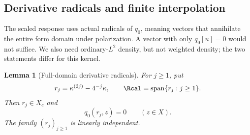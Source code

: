 \documentclass[11pt,a4paper]{article}
\numberwithin{equation}{section}
\newtheorem{lemma}[theorem]{Lemma}
\theoremstyle{definition}\newtheorem{definition}[theorem]{Definition}
\theoremstyle{remark}\newtheorem{remark}[theorem]{Remark}
\begin{document}
\subsection{Derivative radicals and finite interpolation}\label{a:sec:radical}

The scaled response uses actual radicals of $q_0$, meaning vectors that annihilate the entire form domain under polarization. A vector with only $q_0[u]=0$ would not suffice. We also need ordinary-$L^2$ density, but not weighted density; the two statements differ for this kernel.

\begin{lemma}[Full-domain derivative radicals]\label{a:lem:radical}
For $j\ge1$, put
\begin{equation}\label{a:eq:radical}
 r_j=\kappa^{(2j)}-4^{-j}\kappa,\qquad
 \Rcal=\operatorname{span}\{r_j:j\ge1\}.
\end{equation}
Then $r_j\in X_c$ and
\begin{equation}\label{a:eq:radicalidentity}
 q_0(r_j,z)=0\qquad(z\in X).
\end{equation}
The family $(r_j)_{j\ge1}$ is linearly independent.
\end{lemma}
\end{document}
